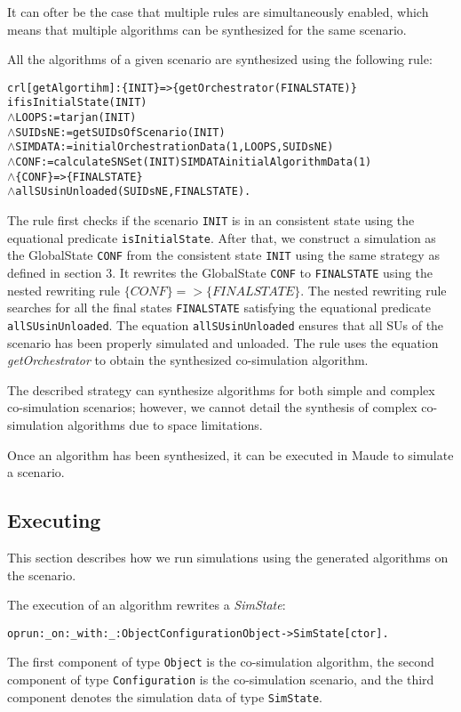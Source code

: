 It can ofter be the case that multiple rules are simultaneously enabled, which means that multiple algorithms can be synthesized for the same scenario.

All the algorithms of a given scenario are synthesized using the following rule:

\begin{alltt}
  \small
crl [getAlgortihm]: \{ INIT \} => \{ getOrchestrator(FINALSTATE) \}
if isInitialState(INIT)
  \(\land\) LOOPS := tarjan(INIT)
  \(\land\) SUIDsNE := getSUIDsOfScenario(INIT)
  \(\land\) SIMDATA := initialOrchestrationData(1,LOOPS,SUIDsNE)
  \(\land\) CONF := calculateSNSet(INIT) SIMDATA initialAlgorithmData(1)
  \(\land\) \{CONF\} => \{ FINALSTATE\} 
  \(\land\) allSUsinUnloaded(SUIDsNE, FINALSTATE) .
\end{alltt}

The rule first checks if the scenario \texttt{INIT} is in an consistent state using the equational predicate \texttt{isInitialState}.
After that, we construct a simulation as the GlobalState \texttt{CONF} from the consistent state \texttt{INIT} using the same strategy as defined in section 3.
It rewrites the GlobalState \texttt{CONF} to \texttt{FINALSTATE} using the nested rewriting rule $\{CONF\} => \{ FINALSTATE\}$.
The nested rewriting rule searches for all the final states \texttt{FINALSTATE} satisfying the equational predicate \texttt{allSUsinUnloaded}.
The equation \texttt{allSUsinUnloaded} ensures that all SUs of the scenario has been properly simulated and unloaded.
The rule uses the equation \emph{getOrchestrator} to obtain the synthesized co-simulation algorithm.

The described strategy can synthesize algorithms for both simple and complex co-simulation scenarios; however, we cannot detail the synthesis of complex co-simulation algorithms due to space limitations.

Once an algorithm has been synthesized, it can be executed in Maude to simulate a scenario.

\subsection{Executing}
This section describes how we run simulations using the generated algorithms on the scenario.

The execution of an algorithm rewrites a \emph{SimState}:
\small
\begin{alltt}
op run:_on:_with:_ : Object Configuration Object -> SimState [ctor]. 
\end{alltt}
\normalsize
The first component of type \texttt{Object} is the co-simulation algorithm, the second component of type \texttt{Configuration} is the co-simulation scenario, and the third component denotes the simulation data of type \texttt{SimState}.

